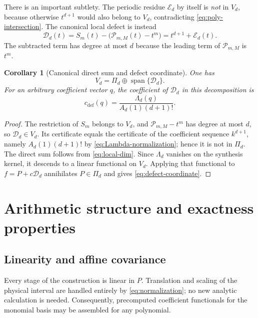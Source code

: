 \documentclass[11pt,oneside]{article}
\newtheorem{corollary}[theorem]{Corollary}
\theoremstyle{definition}
\theoremstyle{remark}
\newcommand{\Span}{\operatorname{span}}
\begin{document}
There is an important subtlety.  The periodic residue $\mathcal E_d$ by itself is \emph{not} in $V_d$, because otherwise $t^{d+1}$ would also belong to $V_d$, contradicting \eqref{eq:poly-intersection}.  The canonical local defect is instead
\begin{equation}
 \mathcal D_d(t)
 =S_m(t)-\bigl(\mathcal P_{m,M}(t)-t^m\bigr)
 =t^{d+1}+\mathcal E_d(t).                                \label{eq:Ddef}
\end{equation}
The subtracted term has degree at most $d$ because the leading term of $\mathcal P_{m,M}$ is $t^m$.

\begin{corollary}[Canonical direct sum and defect coordinate]
\label{cor:defect-decomp}
One has
\begin{equation}
 \boxed{V_d=\Pi_d\oplus\Span\{\mathcal D_d\}.}           \label{eq:direct-sum}
\end{equation}
For an arbitrary coefficient vector $q$, the coefficient of $\mathcal D_d$ in this decomposition is
\begin{equation}
 c_{\mathrm{def}}(q)=
 \frac{\Lambda_d(q)}{A_d(1)(d+1)!}.                       \label{eq:defect-coordinate}
\end{equation}
\end{corollary}

\begin{proof}
The restriction of $S_m$ belongs to $V_d$, and $\mathcal P_{m,M}-t^m$ has degree at most $d$, so $\mathcal D_d\in V_d$.  Its certificate equals the certificate of the coefficient sequence $k^{d+1}$, namely $A_d(1)(d+1)!$ by \eqref{eq:Lambda-normalization}; hence it is not in $\Pi_d$.  The direct sum follows from \eqref{eq:local-dim}.  Since $\Lambda_d$ vanishes on the synthesis kernel, it descends to a linear functional on $V_d$.  Applying that functional to $f=P+c\mathcal D_d$ annihilates $P\in\Pi_d$ and gives \eqref{eq:defect-coordinate}.
\end{proof}

\section{Arithmetic structure and exactness properties}

\subsection{Linearity and affine covariance}
Every stage of the construction is linear in $P$.  Translation and scaling of the physical interval are handled entirely by \eqref{eq:normalization}; no new analytic calculation is needed.  Consequently, precomputed coefficient functionals for the monomial basis may be assembled for any polynomial.
\end{document}
